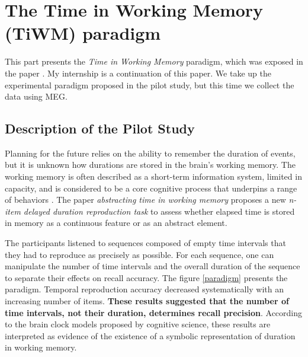  
\section{The Time in Working Memory (TiWM) paradigm}
 
This part presents the \textit{Time in Working Memory} paradigm, which was exposed in the paper \cite{herbst2021abstracting}. My internship is a continuation of this paper. We take up the experimental paradigm proposed in the pilot study, but this time we collect the data using MEG.
 
\subsection{Description of the Pilot Study}
 
Planning for the future relies on the ability to remember the duration of events, but it is unknown how durations are stored in the brain's working memory. The working memory is often described as a short-term information system, limited in capacity, and is considered to be a core cognitive process that underpins a range of behaviors \cite{ma2014changing}. The paper \textit{abstracting time in working memory} proposes a new \textit{n-item delayed duration reproduction task} to assess whether elapsed time is stored in memory as a continuous feature or as an abstract element.
 

The participants listened to sequences composed of empty time intervals that they had to reproduce as precisely as possible. For each sequence, one can manipulate the number of time intervals and the overall duration of the sequence to separate their effects on recall accuracy. The figure \ref{paradigm} presents the paradigm. Temporal reproduction accuracy decreased systematically with an increasing number of items. \textbf{These results suggested that the number of time intervals, not their duration, determines recall precision}. According to the brain clock models proposed by cognitive science, these results are interpreted as evidence of the existence of a symbolic representation of duration in working memory.
 

